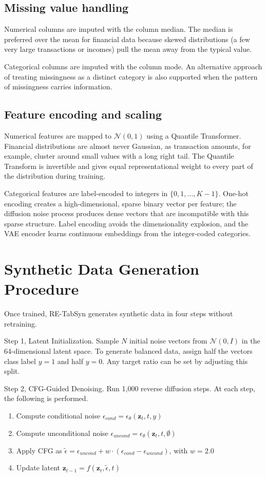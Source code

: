 \subsection{Missing value handling}

Numerical columns are imputed with the column median. The median is preferred over the mean for financial data because skewed distributions (a few very large transactions or incomes) pull the mean away from the typical value.

Categorical columns are imputed with the column mode. An alternative approach of treating missingness as a distinct category is also supported when the pattern of missingness carries information.

\subsection{Feature encoding and scaling}

Numerical features are mapped to $\mathcal{N}(0, 1)$ using a Quantile Transformer. Financial distributions are almost never Gaussian, as transaction amounts, for example, cluster around small values with a long right tail. The Quantile Transform is invertible and gives equal representational weight to every part of the distribution during training.

Categorical features are label-encoded to integers in $\{0, 1, \ldots, K-1\}$. One-hot encoding creates a high-dimensional, sparse binary vector per feature; the diffusion noise process produces dense vectors that are incompatible with this sparse structure. Label encoding avoids the dimensionality explosion, and the VAE encoder learns continuous embeddings from the integer-coded categories.

\section{Synthetic Data Generation Procedure}

Once trained, RE-TabSyn generates synthetic data in four steps without retraining.

Step 1, Latent Initialization. Sample $N$ initial noise vectors from $\mathcal{N}(0, I)$ in the 64-dimensional latent space. To generate balanced data, assign half the vectors class label $y = 1$ and half $y = 0$. Any target ratio can be set by adjusting this split.

Step 2, CFG-Guided Denoising. Run 1,000 reverse diffusion steps. At each step, the following is performed.
\begin{enumerate}
    \item Compute conditional noise $\epsilon_{cond} = \epsilon_\theta(\mathbf{z}_t, t, y)$
    \item Compute unconditional noise $\epsilon_{uncond} = \epsilon_\theta(\mathbf{z}_t, t, \emptyset)$
    \item Apply CFG as $\tilde{\epsilon} = \epsilon_{uncond} + w \cdot (\epsilon_{cond} - \epsilon_{uncond})$, with $w = 2.0$
    \item Update latent $\mathbf{z}_{t-1} = f(\mathbf{z}_t, \tilde{\epsilon}, t)$
\end{enumerate}

